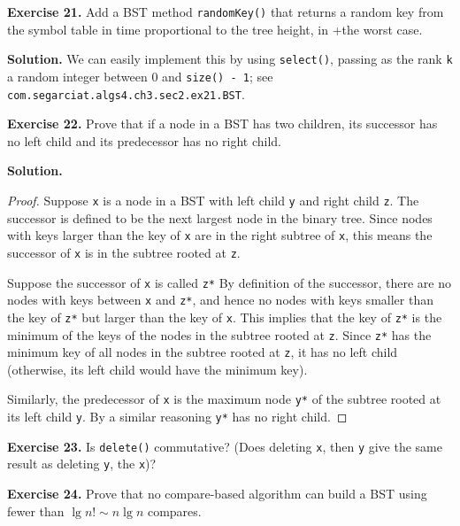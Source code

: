 \documentclass[12pt, a4paper]{article}
\newenvironment{ex}[2][Exercise]
{\par\medskip\noindent \textbf{#1 #2.}}
{\medskip}
\newenvironment{sol}[1][Solution]
{\par\medskip\noindent \textbf{#1.} }
{\medskip}
\begin{document}
	\begin{ex}{21}
		Add a BST method \texttt{randomKey()} that returns a random key from the symbol table
		in time proportional to the tree height, in +the worst case.
	\end{ex}
	\begin{sol}
		We can easily implement this by using \texttt{select()}, passing as
		the rank \texttt{k} a random integer between 0 and \texttt{size() - 1};
		see \texttt{com.segarciat.algs4.ch3.sec2.ex21.BST}.
	\end{sol}
	\begin{ex}{22}
		Prove that if a node in a BST has two children, its successor has no left child
		and its predecessor has no right child.
	\end{ex}
	\begin{sol}
		\begin{proof}
			Suppose \texttt{x} is a node in a BST with left child \texttt{y} and right child
			\texttt{z}. The successor is defined to be the next largest node in the binary
			tree. Since nodes with keys larger than the key of \texttt{x} are in the right
			subtree of \texttt{x}, this means the successor of \texttt{x} is in the subtree
			rooted at \texttt{z}.
			
			Suppose the successor of \texttt{x} is called \texttt{z*} By definition of the
			successor, there are no nodes with keys between \texttt{x} and \texttt{z*}, and
			hence no nodes with keys smaller than the key of \texttt{z*} but larger than the
			key of \texttt{x}. This implies that the key of \texttt{z*} is the minimum of the
			keys of the nodes in the subtree rooted at \texttt{z}. Since \texttt{z*} has the
			minimum key of all nodes in the subtree rooted at \texttt{z}, it has no left
			child (otherwise, its left child would have the minimum key).
			
			Similarly, the predecessor
			of \texttt{x} is the maximum node \texttt{y*} of the subtree rooted at its left child \texttt{y}. By a similar reasoning \texttt{y*} has no right child.
		\end{proof}
	\end{sol}
	\begin{ex}{23}
		Is \texttt{delete()} commutative? (Does deleting \texttt{x}, then \texttt{y} give
		the same result as deleting \texttt{y}, the \texttt{x})?
	\end{ex}
	\begin{ex}{24}
		Prove that no compare-based algorithm can build a BST using fewer than $\lg n!\sim n\lg n$
		compares.
	\end{ex}
\end{document}
